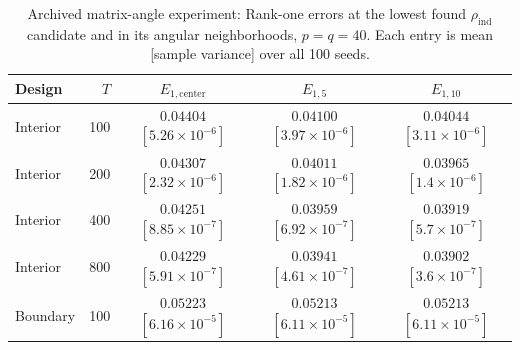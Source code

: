 \documentclass[12pt,letterpaper]{article}
\def\spacingset#1{\renewcommand{\baselinestretch}{#1}\small\normalsize}
\theoremstyle{plain}
\theoremstyle{definition}
\begin{document}
\begin{table}[p]
\begingroup
\spacingset{1.08}
\centering
\caption{Archived matrix-angle experiment: Rank-one errors at the lowest found $\rho_{\mathrm{ind}}$ candidate and in its angular neighborhoods, $p=q=40$. Each entry is mean [sample variance] over all 100 seeds.}
\label{s23:tab:cap_comparison}
\small
\setlength{\tabcolsep}{6pt}
\renewcommand{\arraystretch}{1.10}
\begin{adjustbox}{max width=\linewidth}
\begin{tabular}{lrccc}
\toprule
Design & $T$ & $E_{1,\mathrm{center}}$ & $E_{1,5}$ & $E_{1,10}$\\
\midrule
Interior & 100 & \shortstack{$0.04404$\\{\scriptsize$[5.26\times10^{-6}]$}} & \shortstack{$0.04100$\\{\scriptsize$[3.97\times10^{-6}]$}} & \shortstack{$0.04044$\\{\scriptsize$[3.11\times10^{-6}]$}}\\
Interior & 200 & \shortstack{$0.04307$\\{\scriptsize$[2.32\times10^{-6}]$}} & \shortstack{$0.04011$\\{\scriptsize$[1.82\times10^{-6}]$}} & \shortstack{$0.03965$\\{\scriptsize$[1.4\times10^{-6}]$}}\\
Interior & 400 & \shortstack{$0.04251$\\{\scriptsize$[8.85\times10^{-7}]$}} & \shortstack{$0.03959$\\{\scriptsize$[6.92\times10^{-7}]$}} & \shortstack{$0.03919$\\{\scriptsize$[5.7\times10^{-7}]$}}\\
Interior & 800 & \shortstack{$0.04229$\\{\scriptsize$[5.91\times10^{-7}]$}} & \shortstack{$0.03941$\\{\scriptsize$[4.61\times10^{-7}]$}} & \shortstack{$0.03902$\\{\scriptsize$[3.6\times10^{-7}]$}}\\
\addlinespace
Boundary & 100 & \shortstack{$0.05223$\\{\scriptsize$[6.16\times10^{-5}]$}} & \shortstack{$0.05213$\\{\scriptsize$[6.11\times10^{-5}]$}} & \shortstack{$0.05213$\\{\scriptsize$[6.11\times10^{-5}]$}}\\

\end{tabular}
\end{adjustbox}
\end{table}
\end{document}
